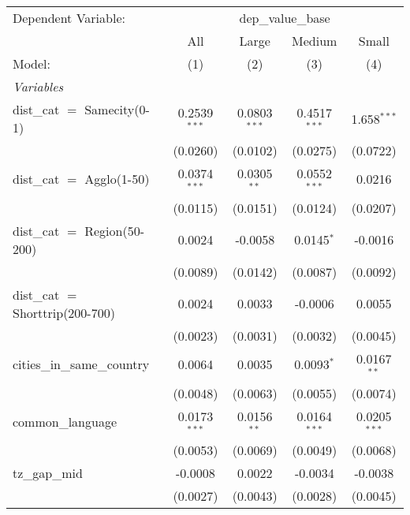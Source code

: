 
\begingroup
\centering
\begin{tabular}{lcccc}
   \tabularnewline \midrule \midrule
   Dependent Variable: & \multicolumn{4}{c}{dep\_value\_base}\\
                                     & All            & Large          & Medium         & Small \\   
   Model:                            & (1)            & (2)            & (3)            & (4)\\  
   \midrule
   \emph{Variables}\\
   dist\_cat $=$ Samecity(0-1)       & 0.2539$^{***}$ & 0.0803$^{***}$ & 0.4517$^{***}$ & 1.658$^{***}$\\   
                                     & (0.0260)       & (0.0102)       & (0.0275)       & (0.0722)\\   
   dist\_cat $=$ Agglo(1-50)         & 0.0374$^{***}$ & 0.0305$^{**}$  & 0.0552$^{***}$ & 0.0216\\   
                                     & (0.0115)       & (0.0151)       & (0.0124)       & (0.0207)\\   
   dist\_cat $=$ Region(50-200)      & 0.0024         & -0.0058        & 0.0145$^{*}$   & -0.0016\\   
                                     & (0.0089)       & (0.0142)       & (0.0087)       & (0.0092)\\   
   dist\_cat $=$ Shorttrip(200-700)  & 0.0024         & 0.0033         & -0.0006        & 0.0055\\   
                                     & (0.0023)       & (0.0031)       & (0.0032)       & (0.0045)\\   
   cities\_in\_same\_country         & 0.0064         & 0.0035         & 0.0093$^{*}$   & 0.0167$^{**}$\\   
                                     & (0.0048)       & (0.0063)       & (0.0055)       & (0.0074)\\   
   common\_language                  & 0.0173$^{***}$ & 0.0156$^{**}$  & 0.0164$^{***}$ & 0.0205$^{***}$\\   
                                     & (0.0053)       & (0.0069)       & (0.0049)       & (0.0068)\\   
   tz\_gap\_mid                      & -0.0008        & 0.0022         & -0.0034        & -0.0038\\   
                                     & (0.0027)       & (0.0043)       & (0.0028)       & (0.0045)\\   

\end{tabular}

